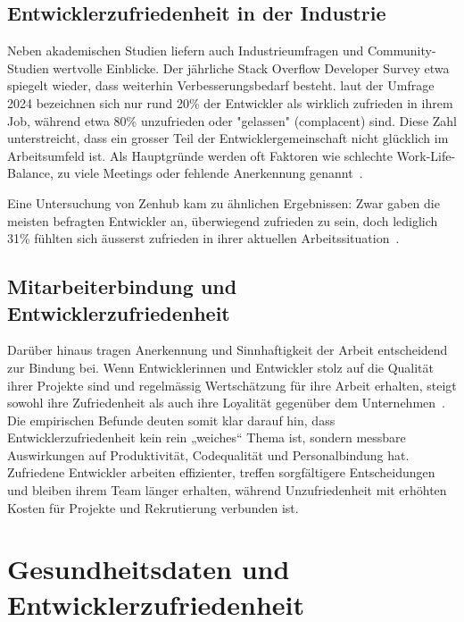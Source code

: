 \documentclass[12pt,a4paper]{report}
\begin{document}
\subsection{Entwicklerzufriedenheit in der Industrie}

Neben akademischen Studien liefern auch Industrieumfragen und Community-Studien wertvolle Einblicke. Der jährliche Stack Overflow
Developer Survey etwa spiegelt wieder, dass weiterhin Verbesserungsbedarf besteht. laut der Umfrage 2024 bezeichnen sich nur rund
20\% der Entwickler als wirklich zufrieden in ihrem Job, während etwa 80\% unzufrieden oder "gelassen" (complacent) sind. Diese Zahl
unterstreicht, dass ein grosser Teil der Entwicklergemeinschaft nicht glücklich im Arbeitsumfeld ist. Als Hauptgründe werden oft
Faktoren wie schlechte Work-Life-Balance, zu viele Meetings oder fehlende Anerkennung genannt~\cite{stackoverflow_survey_2025}.

Eine Untersuchung von Zenhub kam zu ähnlichen Ergebnissen: Zwar gaben die meisten befragten Entwickler an, überwiegend zufrieden
zu sein, doch lediglich 31\% fühlten sich äusserst zufrieden in ihrer aktuellen Arbeitssituation~\cite{zenhub_2022_nodate}.

\subsection{Mitarbeiterbindung und Entwicklerzufriedenheit}

Darüber hinaus tragen Anerkennung und Sinnhaftigkeit der Arbeit entscheidend zur Bindung bei. Wenn Entwicklerinnen und Entwickler
stolz auf die Qualität ihrer Projekte sind und regelmässig Wertschätzung für ihre Arbeit erhalten, steigt sowohl ihre Zufriedenheit
als auch ihre Loyalität gegenüber dem Unternehmen~\cite{sadowski_happiness_2019,graziotin_what_2018}. Die empirischen Befunde deuten
somit klar darauf hin, dass Entwicklerzufriedenheit kein rein „weiches“ Thema ist, sondern messbare Auswirkungen auf Produktivität,
Codequalität und Personalbindung hat. Zufriedene Entwickler arbeiten effizienter, treffen sorgfältigere Entscheidungen und bleiben
ihrem Team länger erhalten, während Unzufriedenheit mit erhöhten Kosten für Projekte und Rekrutierung verbunden ist.

\section{Gesundheitsdaten und Entwicklerzufriedenheit}\label{stateoftheart-gesundheit}
\end{document}
